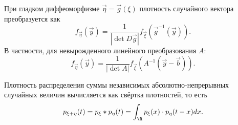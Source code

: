 \begin{proposition}
    При гладком диффеоморфизме $\vec{\eta} = \vec{g}(\xi)$ плотность случайного вектора преобразуется как
    \[
        f_{\vec{\eta}}(\vec{y}) = \dfrac{1}{|\det D\vec{g}|}f_{\vec{\xi}}(\vec{g}^{-1}(\vec{y})).
    \]
    В частности, для невырожденного линейного преобразования $A$:
    \[
        f_{\vec{\eta}}(\vec{y}) = \dfrac{1}{|\det A|}f_{\vec{\xi}}(A^{-1}(\vec{y} - \vec{b})).
    \]
\end{proposition}
\begin{proposition}
    Плотность распределения суммы независимых абсолютно-непрерывных случайных величин вычисляется как свёртка плотностей, то есть
    \[
        p_{\xi + \eta}(t) = p_{\xi} * p_{\eta}(t) = \int_{\R} p_{\xi}(x) \cdot p_{\eta}(t - x)dx.
    \]
\end{proposition}
